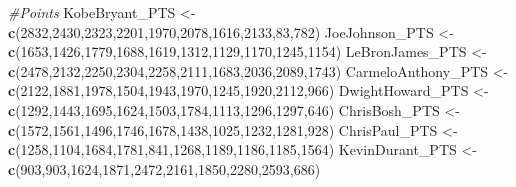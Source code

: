 \documentclass[
]{article}
\newenvironment{Shaded}{\begin{snugshade}}{\end{snugshade}}
\newcommand{\CommentTok}[1]{\textcolor[rgb]{0.56,0.35,0.01}{\textit{#1}}}
\newcommand{\DecValTok}[1]{\textcolor[rgb]{0.00,0.00,0.81}{#1}}
\newcommand{\KeywordTok}[1]{\textcolor[rgb]{0.13,0.29,0.53}{\textbf{#1}}}
\newcommand{\NormalTok}[1]{#1}
\newcommand{\StringTok}[1]{\textcolor[rgb]{0.31,0.60,0.02}{#1}}
\begin{document}
\begin{Shaded}
\begin{Highlighting}[]
\CommentTok{#Points}
\NormalTok{KobeBryant_PTS <-}\StringTok{ }\KeywordTok{c}\NormalTok{(}\DecValTok{2832}\NormalTok{,}\DecValTok{2430}\NormalTok{,}\DecValTok{2323}\NormalTok{,}\DecValTok{2201}\NormalTok{,}\DecValTok{1970}\NormalTok{,}\DecValTok{2078}\NormalTok{,}\DecValTok{1616}\NormalTok{,}\DecValTok{2133}\NormalTok{,}\DecValTok{83}\NormalTok{,}\DecValTok{782}\NormalTok{)}
\NormalTok{JoeJohnson_PTS <-}\StringTok{ }\KeywordTok{c}\NormalTok{(}\DecValTok{1653}\NormalTok{,}\DecValTok{1426}\NormalTok{,}\DecValTok{1779}\NormalTok{,}\DecValTok{1688}\NormalTok{,}\DecValTok{1619}\NormalTok{,}\DecValTok{1312}\NormalTok{,}\DecValTok{1129}\NormalTok{,}\DecValTok{1170}\NormalTok{,}\DecValTok{1245}\NormalTok{,}\DecValTok{1154}\NormalTok{)}
\NormalTok{LeBronJames_PTS <-}\StringTok{ }\KeywordTok{c}\NormalTok{(}\DecValTok{2478}\NormalTok{,}\DecValTok{2132}\NormalTok{,}\DecValTok{2250}\NormalTok{,}\DecValTok{2304}\NormalTok{,}\DecValTok{2258}\NormalTok{,}\DecValTok{2111}\NormalTok{,}\DecValTok{1683}\NormalTok{,}\DecValTok{2036}\NormalTok{,}\DecValTok{2089}\NormalTok{,}\DecValTok{1743}\NormalTok{)}
\NormalTok{CarmeloAnthony_PTS <-}\StringTok{ }\KeywordTok{c}\NormalTok{(}\DecValTok{2122}\NormalTok{,}\DecValTok{1881}\NormalTok{,}\DecValTok{1978}\NormalTok{,}\DecValTok{1504}\NormalTok{,}\DecValTok{1943}\NormalTok{,}\DecValTok{1970}\NormalTok{,}\DecValTok{1245}\NormalTok{,}\DecValTok{1920}\NormalTok{,}\DecValTok{2112}\NormalTok{,}\DecValTok{966}\NormalTok{)}
\NormalTok{DwightHoward_PTS <-}\StringTok{ }\KeywordTok{c}\NormalTok{(}\DecValTok{1292}\NormalTok{,}\DecValTok{1443}\NormalTok{,}\DecValTok{1695}\NormalTok{,}\DecValTok{1624}\NormalTok{,}\DecValTok{1503}\NormalTok{,}\DecValTok{1784}\NormalTok{,}\DecValTok{1113}\NormalTok{,}\DecValTok{1296}\NormalTok{,}\DecValTok{1297}\NormalTok{,}\DecValTok{646}\NormalTok{)}
\NormalTok{ChrisBosh_PTS <-}\StringTok{ }\KeywordTok{c}\NormalTok{(}\DecValTok{1572}\NormalTok{,}\DecValTok{1561}\NormalTok{,}\DecValTok{1496}\NormalTok{,}\DecValTok{1746}\NormalTok{,}\DecValTok{1678}\NormalTok{,}\DecValTok{1438}\NormalTok{,}\DecValTok{1025}\NormalTok{,}\DecValTok{1232}\NormalTok{,}\DecValTok{1281}\NormalTok{,}\DecValTok{928}\NormalTok{)}
\NormalTok{ChrisPaul_PTS <-}\StringTok{ }\KeywordTok{c}\NormalTok{(}\DecValTok{1258}\NormalTok{,}\DecValTok{1104}\NormalTok{,}\DecValTok{1684}\NormalTok{,}\DecValTok{1781}\NormalTok{,}\DecValTok{841}\NormalTok{,}\DecValTok{1268}\NormalTok{,}\DecValTok{1189}\NormalTok{,}\DecValTok{1186}\NormalTok{,}\DecValTok{1185}\NormalTok{,}\DecValTok{1564}\NormalTok{)}
\NormalTok{KevinDurant_PTS <-}\StringTok{ }\KeywordTok{c}\NormalTok{(}\DecValTok{903}\NormalTok{,}\DecValTok{903}\NormalTok{,}\DecValTok{1624}\NormalTok{,}\DecValTok{1871}\NormalTok{,}\DecValTok{2472}\NormalTok{,}\DecValTok{2161}\NormalTok{,}\DecValTok{1850}\NormalTok{,}\DecValTok{2280}\NormalTok{,}\DecValTok{2593}\NormalTok{,}\DecValTok{686}\NormalTok{)}

\end{Highlighting}
\end{Shaded}
\end{document}
